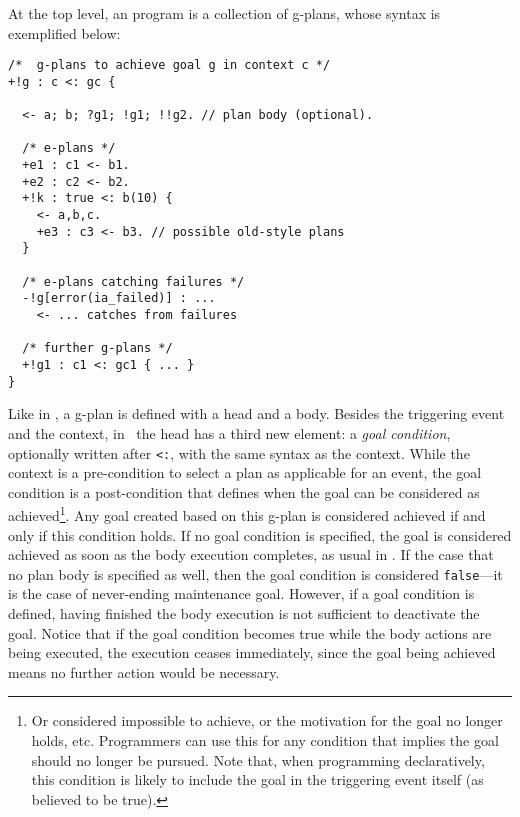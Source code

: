 At the top level, an {\aser} program is a collection of g-plans, whose
syntax is exemplified below:
%
%
{\small
\begin{verbatim}
/*  g-plans to achieve goal g in context c */
+!g : c <: gc { 

  <- a; b; ?g1; !g1; !!g2. // plan body (optional).

  /* e-plans */
  +e1 : c1 <- b1.	
  +e2 : c2 <- b2.
  +!k : true <: b(10) {
    <- a,b,c.
    +e3 : c3 <- b3. // possible old-style plans
  }	
  
  /* e-plans catching failures */
  -!g[error(ia_failed)] : ...
    <- ... catches from failures 

  /* further g-plans */
  +!g1 : c1 <: gc1 { ... }
}
\end{verbatim}}

Like in {\asl}, a g-plan is defined with a head and a body.
%
Besides the triggering event and the context, in \aser\ the head has a
third new element: a \emph{goal condition}, optionally written after
\texttt{<:}, with the same syntax as the context. While the context is
a pre-condition to select a plan as applicable for an event, the goal
condition is a post-condition that defines when the goal can be
considered as achieved\footnote{Or considered impossible to achieve,
  or the motivation for the goal no longer holds, etc. Programmers can
  use this for any condition that implies the goal should no longer be
  pursued. Note that, when programming declaratively, this condition
  is likely to include the goal in the triggering event itself (as
  believed to be true).}. Any goal created based on this g-plan is
considered achieved if and only if
this condition holds. 
%
If no goal condition is specified, the goal is considered achieved as soon 
as the body execution completes, as usual in \asl. 
If the case that no plan body is specified as well, then the goal condition is 
considered \texttt{false}---it is the case of never-ending maintenance goal.
%
However, if a goal condition is defined, having finished the
body execution is not sufficient to deactivate the goal. Notice that
if the goal condition becomes true while the body actions are being
executed, the execution ceases immediately, since the goal being
achieved means no further action would be necessary.

